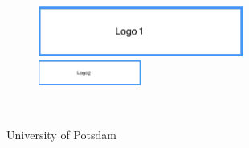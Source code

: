 \thispagestyle{empty}


\begin{figure}[t]
 \centering
 \includegraphics[width=0.6\textwidth]{fig/logo1}
~~~~~~~~~~
 \includegraphics[width=0.3\textwidth]{fig/logo2}
\end{figure}


\begin{verbatim}


\end{verbatim}

\begin{center}
\Large{University of Potsdam}\\
\end{center}


